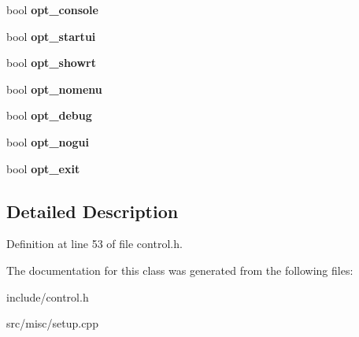 \begin{DoxyCompactItemize}
\item 
\hypertarget{classConfig_ac60d20f3d6db383b0278989e78499371}{bool {\bfseries opt\-\_\-console}}\label{classConfig_ac60d20f3d6db383b0278989e78499371}

\item 
\hypertarget{classConfig_a60d72de7a98e1d1142a21103f3165196}{bool {\bfseries opt\-\_\-startui}}\label{classConfig_a60d72de7a98e1d1142a21103f3165196}

\item 
\hypertarget{classConfig_a0b78abf9471b6a2d04d228be7e6792f2}{bool {\bfseries opt\-\_\-showrt}}\label{classConfig_a0b78abf9471b6a2d04d228be7e6792f2}

\item 
\hypertarget{classConfig_ace74f2fb3b918cc45b2486a59281cafc}{bool {\bfseries opt\-\_\-nomenu}}\label{classConfig_ace74f2fb3b918cc45b2486a59281cafc}

\item 
\hypertarget{classConfig_a7d68ad804907496b417a951ed1eada22}{bool {\bfseries opt\-\_\-debug}}\label{classConfig_a7d68ad804907496b417a951ed1eada22}

\item 
\hypertarget{classConfig_ae904e5c4af1cac4af77feb7af250ad29}{bool {\bfseries opt\-\_\-nogui}}\label{classConfig_ae904e5c4af1cac4af77feb7af250ad29}

\item 
\hypertarget{classConfig_a9f68df279656da4abd730ffa83fbb38a}{bool {\bfseries opt\-\_\-exit}}\label{classConfig_a9f68df279656da4abd730ffa83fbb38a}

\end{DoxyCompactItemize}


\subsection{Detailed Description}


Definition at line 53 of file control.\-h.



The documentation for this class was generated from the following files\-:\begin{DoxyCompactItemize}
\item 
include/control.\-h\item 
src/misc/setup.\-cpp\end{DoxyCompactItemize}
